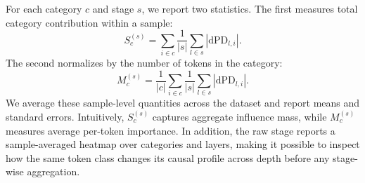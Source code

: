 \documentclass[11pt]{article}
\begin{document}
For each category $c$ and stage $s$, we report two statistics. The first measures total category contribution within a sample:
\begin{equation}
S_{c}^{(s)} = \sum_{i \in c} \frac{1}{|s|}\sum_{l \in s} |\mathrm{dPD}_{l,i}|.
\end{equation}
The second normalizes by the number of tokens in the category:
\begin{equation}
M_{c}^{(s)} = \frac{1}{|c|}\sum_{i \in c} \frac{1}{|s|}\sum_{l \in s} |\mathrm{dPD}_{l,i}|.
\end{equation}
We average these sample-level quantities across the dataset and report means and standard errors. Intuitively, $S_{c}^{(s)}$ captures aggregate influence mass, while $M_{c}^{(s)}$ measures average per-token importance. In addition, the raw stage reports a sample-averaged heatmap over categories and layers, making it possible to inspect how the same token class changes its causal profile across depth before any stage-wise aggregation.
\end{document}
